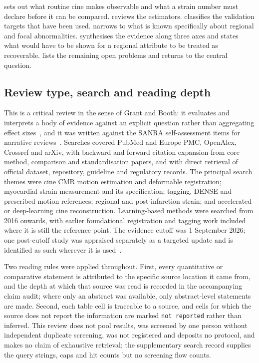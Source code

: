  sets out what routine cine makes observable and what a strain number must
declare before it can be compared.  reviews the estimators.
 classifies the validation targets that have been used.
 narrows to what is known specifically about regional and focal abnormalities.
 synthesises the evidence along three axes and states what would have to be
shown for a regional attribute to be treated as recoverable.  lists the remaining
open problems and returns to the central question.

\subsection{Review type, search and reading depth}\label{sec:methods}

This is a critical review in the sense of Grant and Booth: it evaluates and interprets a body of
evidence against an explicit question rather than aggregating effect sizes~\citep{grant2009}, and it
was written against the SANRA self-assessment items for narrative reviews~\citep{baethge2019sanra}.
Searches covered PubMed and Europe PMC, OpenAlex, Crossref and arXiv, with backward and forward
citation expansion from core method, comparison and standardisation papers, and with direct
retrieval of official dataset, repository, guideline and regulatory records. The principal search
themes were cine CMR motion estimation and deformable registration; myocardial strain measurement
and its specification; tagging, DENSE and prescribed-motion references; regional and
post-infarction strain; and accelerated or deep-learning cine reconstruction. Learning-based methods
were searched from 2016 onwards, with earlier foundational registration and tagging work included
where it is still the reference point. The evidence cutoff was 1 September 2026; one post-cutoff
study was appraised separately as a targeted update and is identified as such wherever it is
used~\citep{jahromi2026densecine}.

Two reading rules were applied throughout. First, every quantitative or comparative statement is
attributed to the specific source location it came from, and the depth at which that source was read
is recorded in the accompanying claim audit; where only an abstract was available, only
abstract-level statements are made. Second, each table cell is traceable to a source, and cells for
which the source does not report the information are marked \texttt{not reported} rather than
inferred. This review does not pool results, was screened by one person without independent
duplicate screening, was not registered and deposits no protocol, and makes no claim of exhaustive
retrieval; the supplementary search record supplies the query strings, caps and hit counts but no
screening flow counts.

